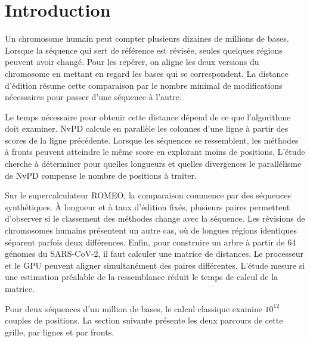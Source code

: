 \section{Introduction}\label{sec:intro}
Un chromosome humain peut compter plusieurs dizaines de millions de bases. Lorsque la séquence qui sert de référence est révisée, seules quelques régions peuvent avoir changé. Pour les repérer, on aligne les deux versions du chromosome en mettant en regard les bases qui se correspondent. La distance d’édition résume cette comparaison par le nombre minimal de modifications nécessaires pour passer d’une séquence à l’autre.

Le temps nécessaire pour obtenir cette distance dépend de ce que l’algorithme doit examiner. NvPD calcule en parallèle les colonnes d’une ligne à partir des scores de la ligne précédente. Lorsque les séquences se ressemblent, les méthodes à fronts peuvent atteindre le même score en explorant moins de positions. L’étude cherche à déterminer pour quelles longueurs et quelles divergences le parallélisme de NvPD compense le nombre de positions à traiter.

Sur le supercalculateur ROMEO, la comparaison commence par des séquences synthétiques. À longueur et à taux d’édition fixés, plusieurs paires permettent d’observer si le classement des méthodes change avec la séquence. Les révisions de chromosomes humains présentent un autre cas, où de longues régions identiques séparent parfois deux différences. Enfin, pour construire un arbre à partir de 64 génomes du SARS-CoV-2, il faut calculer une matrice de distances. Le processeur et le GPU peuvent aligner simultanément des paires différentes. L’étude mesure si une estimation préalable de la ressemblance réduit le temps de calcul de la matrice.

Pour deux séquences d’un million de bases, le calcul classique examine \(10^{12}\) couples de positions. La section suivante présente les deux parcours de cette grille, par lignes et par fronts.
